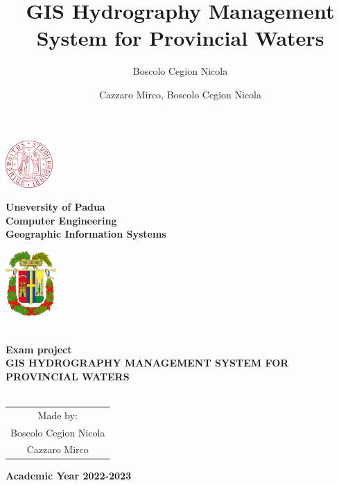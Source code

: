 \documentclass[a4paper, 11pt]{article}
\title{GIS Hydrography Management System for Provincial Waters}
\author{Boscolo Cegion Nicola}
\author{Cazzaro Mirco, Boscolo Cegion Nicola}
\date{}
\begin{document}
\begin{center}
	\begin{minipage}{2.5cm}
	\begin{center}
		\includegraphics[height=1.8cm]{img/unipd.png}
		
	\end{center}
\end{minipage}\hfill
\begin{minipage}{10cm}
	\begin{center}
	\textbf{Uneversity of Padua}\\[0.1cm]
    \textbf{Computer Engineering}\\[0.1cm]
    \textbf{Geographic Information Systems}


	\end{center}
\end{minipage}\hfill
\begin{minipage}{2.5cm}
	\begin{center}
		\includegraphics[height=2.5cm]{img/belluno.png}
	\end{center}

\end{minipage}



\textsc{\Large }\\[1.5cm]
{\large \bfseries Exam project}\\[4.5cm]


{\huge \bfseries \uppercase{GIS Hydrography Management System for Provincial Waters} \\[0.5cm] }
\textsc{\Large }\\[2.5cm]







\begin{tabular}{c}
    Made by:\\[0.5cm]
    {\LARGE Boscolo Cegion Nicola}\\[0.1cm]
    {\LARGE Cazzaro Mirco}\\[0.1cm]
    
\end{tabular}
\vfill

{\textbf{\large {Academic Year} 2022-2023}}

\end{center}


\pagebreak
\tableofcontents







\end{document}
